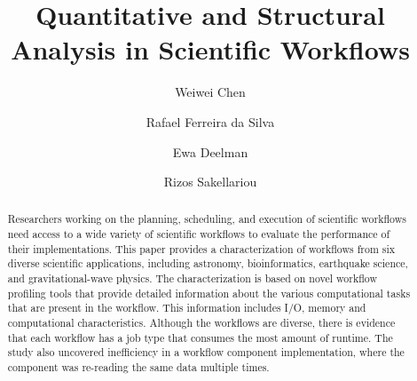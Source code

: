 \documentclass[final,5p,times,twocolumn]{elsarticle}
\begin{document}
\begin{frontmatter}


\title{Quantitative and Structural Analysis in Scientific Workflows}



\author[isi]{Weiwei Chen}

\author[lyon]{Rafael Ferreira da Silva}

\author[isi]{Ewa Deelman}



\author[man]{Rizos Sakellariou}



\address[isi]{University of Southern California, Information Sciences Institute,
		Marina del Rey, CA, USA}
\address[lyon]{University of Lyon, CNRS, Villeurbanne, France}
\address[man]{University of Manchester, School of Computer Science, Manchester, U.K.}


\begin{abstract}
Researchers working on the planning, scheduling, and execution of scientific workflows need access to a wide variety of scientific workflows to evaluate the performance of their implementations. This paper provides a characterization of workflows from six diverse scientific applications, including astronomy, bioinformatics, earthquake science, and gravitational-wave physics. The characterization is based on novel workflow profiling tools that provide detailed information about the various computational tasks that are present in the workflow. This information includes I/O, memory and computational characteristics. Although the workflows are diverse, there is evidence that each workflow has a job type that consumes the most amount of runtime. The study also uncovered inefficiency in a workflow component implementation, where the component was re-reading the same data multiple times.


\end{abstract}
\end{frontmatter}
\end{document}
